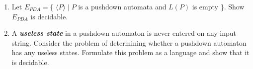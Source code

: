 \documentclass{article}
\begin{document}
\begin{enumerate}
        \item Let $E_{PDA} = $\{ $\langle P \rangle \mid P$ is a pushdown automata and 
        $L(P)$ is empty \}. Show $E_{PDA}$ is decidable.

        \item A \textbf{\textit{useless state}} in a pushdown automaton is never entered 
        on any input string. Consider the problem of determining whether a pushdown 
        automaton has any useless states. Formulate this problem as a language and show 
        that it is decidable.
    \end{enumerate}
\end{document}
